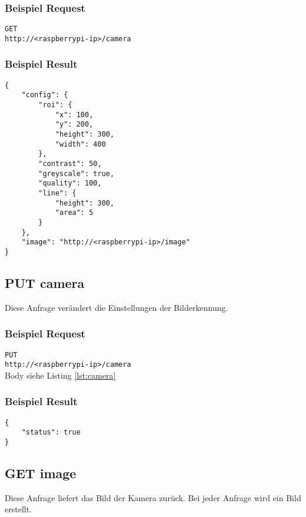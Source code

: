 \subsubsection{Beispiel Request}

\texttt{GET} \\
\texttt{http://<raspberrypi-ip>/camera}

\subsubsection{Beispiel Result}

\begin{lstlisting}[caption=GET camera Result, label=lst:camera, tabsize=2]
{
	"config": {
		"roi": {
			"x": 100,
			"y": 200,
			"height": 300,
			"width": 400
		},
		"contrast": 50,
		"greyscale": true,
		"quality": 100,
		"line": {
			"height": 300,
			"area": 5
		}
	},
	"image": "http://<raspberrypi-ip>/image"
}
\end{lstlisting}

\subsection{PUT camera}

Diese Anfrage verändert die Einstellungen der Bilderkennung.

\subsubsection{Beispiel Request}

\texttt{PUT} \\
\texttt{http://<raspberrypi-ip>/camera} \\
Body siehe Listing \ref{lst:camera}

\subsubsection{Beispiel Result}

\begin{lstlisting}[caption=PUT camera Result, tabsize=2]
{
	"status": true
}
\end{lstlisting}

\subsection{GET image}

Diese Anfrage liefert das Bild der Kamera zurück. Bei jeder Anfrage wird ein Bild erstellt.

